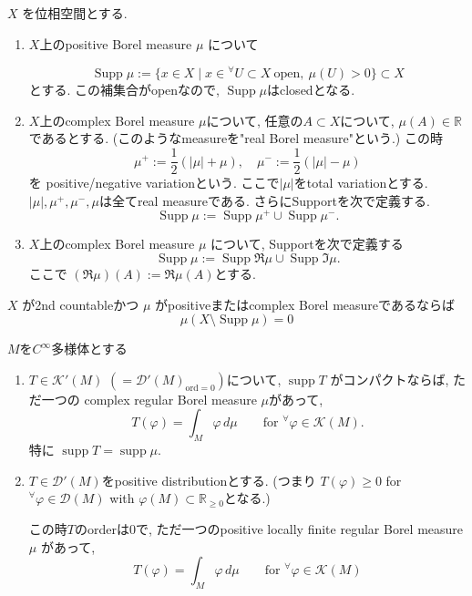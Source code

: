 \begin{tcolorbox}[mybox]
\begin{defn}
\label{defn-M-4.3.1}
\(X\) を位相空間とする.
\begin{enumerate}
\item $X$上のpositive Borel measure \(\mu\) について

\[\operatorname{Supp}\mu := 
\{x \in X \mid x \in {}^{\forall} U \subset X \ \text{open},\ \mu(U) > 0\} \subset X
\]
とする. この補集合がopenなので, $\operatorname{Supp}\mu$はclosedとなる. 

\item $X$上のcomplex Borel measure \(\mu\)について, 
任意の\(A \subset X\)について, \(\mu(A) \in \mathbb{R}\)であるとする. 
(このようなmeasureを"real Borel measure"という.)
この時
\[\mu^{+} := \frac{1}{2}(|\mu|+\mu),\quad \mu^{-} := \frac{1}{2}(|\mu|-\mu)\]
を positive/negative variationという. 
ここで\(|\mu|\)をtotal variationとする. 
\(|\mu|, \mu^{+}, \mu^{-}, \mu\)は全てreal measureである. 
さらにSupportを次で定義する. 
\[
\operatorname{Supp}\mu:=\operatorname{Supp}\mu^{+}\cup \operatorname{Supp}\mu^{-}.
\]

\item $X$上のcomplex Borel measure \(\mu\) について, Supportを次で定義する
\[
\operatorname{Supp}\mu:=\operatorname{Supp}\Re\mu\cup \operatorname{Supp}\Im\mu.
\]
ここで
\((\Re\mu)(A):=\Re \mu(A)\)とする. 
\end{enumerate}
\end{defn}
\end{tcolorbox}

\begin{rem}
\(X\) が2nd countableかつ \(\mu\) がpositiveまたはcomplex Borel measureであるならば
\[
\mu(X\setminus \operatorname{Supp}\mu)=0
\]
\end{rem}

\begin{tcolorbox}[mybox]
\begin{thm}
\label{thm-M-4.3.2}
\(M\)を\(C^{\infty}\)多様体とする
\begin{enumerate}
\item  \(T \in \mathcal{K}'(M)\) \((=\mathcal{D}'(M)_{\mathrm{ord}=0})\)について, 
\(\operatorname{supp} T\) がコンパクトならば, ただ一つの
complex regular Borel measure \(\mu\)があって, 
\[
T(\varphi)=\int_M \varphi\, d\mu \qquad \text{for } {}^{\forall}\varphi\in \mathcal{K}(M).
\]
特に \(\operatorname{supp} T=\operatorname{supp}\mu\).
\item  \(T \in \mathcal{D}'(M)\)をpositive distributionとする. 
(つまり \(T(\varphi)\geq 0\) for \({}^{\forall}\varphi\in \mathcal{D}(M)\) with \(\varphi(M)\subset \mathbb{R}_{\geq 0}\)となる.)

この時$T$のorderは0で, ただ一つのpositive locally finite regular
Borel measure $\mu$ があって, 
\[
T(\varphi)=\int_M \varphi\, d\mu \qquad \text{for } {}^{\forall}\varphi\in \mathcal{K}(M)
\]
\end{enumerate}
\end{thm}
\end{tcolorbox}

